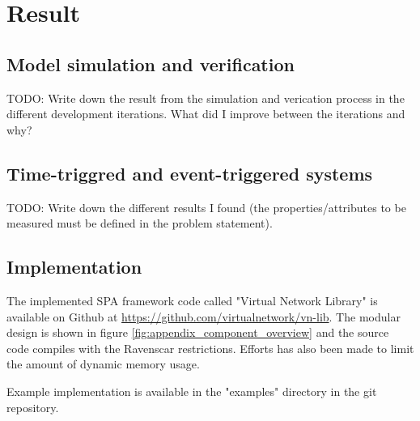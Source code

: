 \chapter{Result}\label{ch:result}
\section{Model simulation and verification}
TODO: Write down the result from the simulation and verication process in the
different development iterations. What did I improve between the iterations and
why?

\section{Time-triggred and event-triggered systems}
TODO: Write down the different results I found (the properties/attributes to be
measured must be defined in the problem statement).

\section{Implementation}
The implemented SPA framework code called "Virtual Network Library" is
available on Github at \url{https://github.com/virtualnetwork/vn-lib}. The
modular design is shown in figure \ref{fig:appendix_component_overview} and the
source code compiles with the Ravenscar restrictions. Efforts has also been
made to limit the amount of dynamic memory usage.

Example implementation is available in the "examples" directory in the git
repository.
